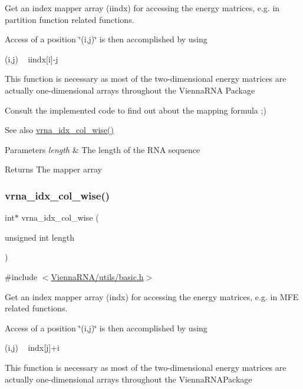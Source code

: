 Get an index mapper array (iindx) for accessing the energy matrices, e.\+g. in partition function related functions. 

Access of a position \char`\"{}(i,j)\char`\"{} is then accomplished by using\begin{DoxyVerb}(i,j) ~ iindx[i]-j \end{DoxyVerb}
 This function is necessary as most of the two-\/dimensional energy matrices are actually one-\/dimensional arrays throughout the Vienna\+R\+NA Package

Consult the implemented code to find out about the mapping formula ;)

\begin{DoxySeeAlso}{See also}
\mbox{\hyperlink{group__utils_ga89ebc69c52fa0c78c9e1974b0017746b}{vrna\+\_\+idx\+\_\+col\+\_\+wise()}} 
\end{DoxySeeAlso}

\begin{DoxyParams}{Parameters}
{\em length} & The length of the R\+NA sequence \\
\hline
\end{DoxyParams}
\begin{DoxyReturn}{Returns}
The mapper array 
\end{DoxyReturn}
\mbox{\label{group__utils_ga89ebc69c52fa0c78c9e1974b0017746b}} 
\subsubsection{\texorpdfstring{vrna\_idx\_col\_wise()}{vrna\_idx\_col\_wise()}}
{\footnotesize\ttfamily int$\ast$ vrna\+\_\+idx\+\_\+col\+\_\+wise (\begin{DoxyParamCaption}\item[{unsigned int}]{length }\end{DoxyParamCaption})}



{\ttfamily \#include $<$\mbox{\hyperlink{utils_2basic_8h}{Vienna\+R\+N\+A/utils/basic.\+h}}$>$}



Get an index mapper array (indx) for accessing the energy matrices, e.\+g. in M\+FE related functions. 

Access of a position \char`\"{}(i,j)\char`\"{} is then accomplished by using\begin{DoxyVerb}(i,j) ~ indx[j]+i \end{DoxyVerb}
 This function is necessary as most of the two-\/dimensional energy matrices are actually one-\/dimensional arrays throughout the Vienna\+R\+N\+A\+Package

